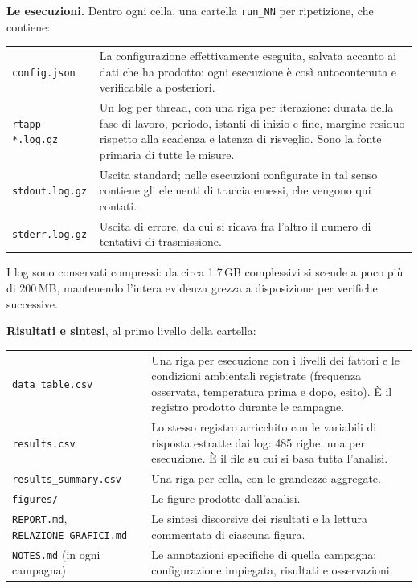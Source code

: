 \documentclass[11pt,a4paper]{article}
\begin{document}
\textbf{Le esecuzioni.} Dentro ogni cella, una cartella \texttt{run\_NN} per ripetizione, che
contiene:

\begin{center}\small
\begin{tabular}{p{4.3cm}p{10.0cm}}
\toprule
\texttt{config.json} & La configurazione effettivamente eseguita, salvata accanto ai dati che ha
prodotto: ogni esecuzione \`e cos\`i autocontenuta e verificabile a posteriori. \\
\addlinespace
\texttt{rtapp-*.log.gz} & Un log per thread, con una riga per iterazione: durata della fase di
lavoro, periodo, istanti di inizio e fine, margine residuo rispetto alla scadenza e latenza di
risveglio. Sono la fonte primaria di tutte le misure. \\
\addlinespace
\texttt{stdout.log.gz} & Uscita standard; nelle esecuzioni configurate in tal senso contiene gli
elementi di traccia emessi, che vengono qui contati. \\
\addlinespace
\texttt{stderr.log.gz} & Uscita di errore, da cui si ricava fra l'altro il numero di tentativi di
trasmissione. \\
\bottomrule
\end{tabular}
\end{center}

I log sono conservati compressi: da circa 1.7\,GB complessivi si scende a poco pi\`u di 200\,MB,
mantenendo l'intera evidenza grezza a disposizione per verifiche successive.

\textbf{Risultati e sintesi}, al primo livello della cartella:

\begin{center}\small
\begin{tabular}{p{4.3cm}p{10.0cm}}
\toprule
\texttt{data\_table.csv} & Una riga per esecuzione con i livelli dei fattori e le condizioni
ambientali registrate (frequenza osservata, temperatura prima e dopo, esito). \`E il registro
prodotto durante le campagne. \\
\addlinespace
\texttt{results.csv} & Lo stesso registro arricchito con le variabili di risposta estratte dai log:
485 righe, una per esecuzione. \`E il file su cui si basa tutta l'analisi. \\
\addlinespace
\texttt{results\_summary.csv} & Una riga per cella, con le grandezze aggregate. \\
\addlinespace
\texttt{figures/} & Le figure prodotte dall'analisi. \\
\addlinespace
\texttt{REPORT.md}, \texttt{RELAZIONE\_GRAFICI.md} & Le sintesi discorsive dei risultati e la
lettura commentata di ciascuna figura. \\
\addlinespace
\texttt{NOTES.md} (in ogni campagna) & Le annotazioni specifiche di quella campagna: configurazione
impiegata, risultati e osservazioni. \\
\bottomrule
\end{tabular}
\end{center}
\end{document}
